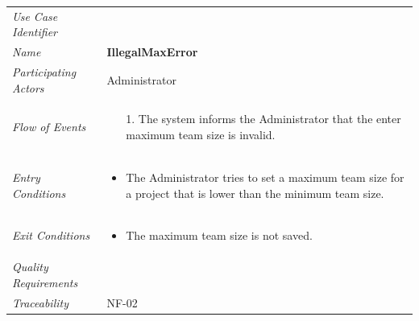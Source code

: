 \documentclass[12pt,letterpaper]{article}
\begin{document}
\begin{center}
	\begin{tabu} to 
		\toprule
		Use Case Identifier & \illegalmaxerror{} \\
		Name & {\bf IllegalMaxError} \\
		Participating Actors & Administrator \\
		Flow of Events & 
		\begin{minipage}[t]{\linewidth}
		    \begin{enumerate}
			    \item[1.] The system informs the Administrator that the enter maximum team size is invalid.
			\end{enumerate}
        \end{minipage} \\

		Entry Conditions &
		\begin{minipage}[t]{\linewidth}
			\begin{itemize}
			    \item The Administrator tries to set a maximum team size for a project that is lower than the minimum team size.
	        \end{itemize}
        \end{minipage} \\

		Exit Conditions &
		\begin{minipage}[t]{\linewidth}
			\begin{itemize}
			    \item The maximum team size is not saved.
	        \end{itemize}
        \end{minipage} \\

		Quality Requirements & \\

		Traceability & NF-02 \\
		\toprule
	\end{tabu}
\end{center}
\end{document}
